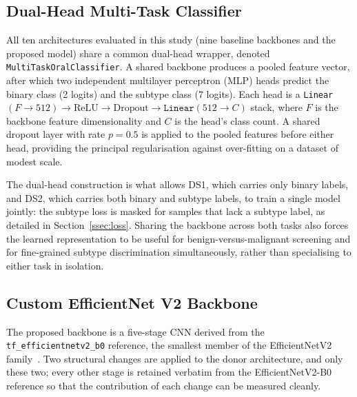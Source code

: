 \subsection{Dual-Head Multi-Task Classifier}\label{ssec:dualhead}

All ten architectures evaluated in this study (nine baseline backbones
and the proposed model) share a common dual-head wrapper, denoted
\texttt{MultiTaskOralClassifier}. A shared backbone produces a pooled
feature vector, after which two independent multilayer perceptron (MLP)
heads predict the binary class (2 logits) and the subtype class (7 logits).
Each head is a \texttt{Linear}$(F\!\rightarrow\!512)\rightarrow
\text{ReLU}\rightarrow\text{Dropout}\rightarrow
\texttt{Linear}(512\!\rightarrow\!C)$ stack, where $F$ is the
backbone feature dimensionality and $C$ is the head's class count. A shared
dropout layer with rate $p=0.5$ is applied to the pooled features before
either head, providing the principal regularisation against over-fitting on
a dataset of modest scale.

The dual-head construction is what allows DS1, which carries only binary
labels, and DS2, which carries both binary and subtype labels, to train a
single model jointly: the subtype loss is masked for samples that lack a
subtype label, as detailed in Section~\ref{ssec:loss}. Sharing the backbone
across both tasks also forces the learned representation to be useful for
benign-versus-malignant screening and for fine-grained subtype
discrimination simultaneously, rather than specialising to either task in
isolation.

\subsection{Custom EfficientNet V2 Backbone}\label{ssec:backbone}

The proposed backbone is a five-stage CNN derived from the
\texttt{tf\_efficientnetv2\_b0} reference, the smallest member of the
EfficientNetV2 family~\cite{tan2021effv2}. Two structural
changes are applied to the donor architecture, and only these two; every
other stage is retained verbatim from the EfficientNetV2-B0 reference so
that the contribution of each change can be measured cleanly.


